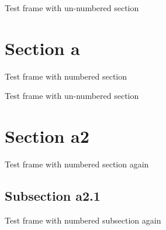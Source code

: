\documentclass{beamer}
\newcommand\Switch{0}
\begin{document}
\begin{frame}
Test frame with un-numbered section
\end{frame}

\renewcommand\Switch{1}
\section{Section a}
\begin{frame}
Test frame with numbered section
\end{frame}

\renewcommand\Switch{0}
\begin{frame}
Test frame with un-numbered section
\end{frame}

\renewcommand\Switch{1}
\section{Section a2}
\begin{frame}
Test frame with numbered section again
\end{frame}

\subsection{Subsection a2.1}
\begin{frame}
Test frame with numbered subsection again
\end{frame}
\end{document}
